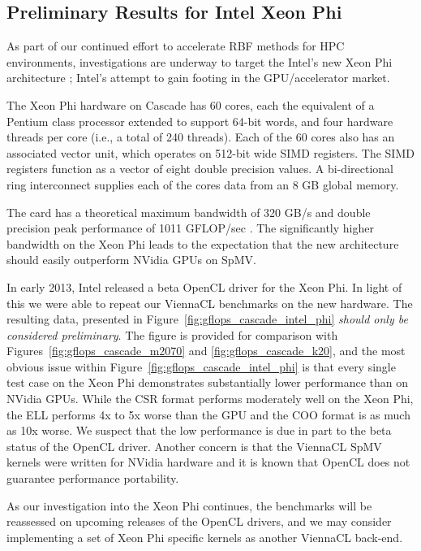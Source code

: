 \documentclass{report}
\begin{document}
\subsection{Preliminary Results for Intel Xeon Phi} 

As part of our continued effort to accelerate RBF methods for HPC environments, investigations are underway to target the Intel's new Xeon Phi architecture \cite{IntelXeonPhi2013}; Intel's attempt to gain footing in the GPU/accelerator market. 

The Xeon Phi hardware on Cascade has 60 cores, each the equivalent of a Pentium class processor extended to support 64-bit words, and four hardware threads per core (i.e., a total of 240 threads). Each of the 60 cores also has an associated vector unit, which operates on 512-bit wide SIMD registers. The SIMD registers function as a vector of eight double precision values. A bi-directional ring interconnect supplies each of the cores data from an 8 GB global memory. 

The card has a theoretical maximum bandwidth of 320 GB/s and double precision peak performance of 1011 GFLOP/sec \cite{IntelXeonPhi2013}. The significantly higher bandwidth on the Xeon Phi leads to the expectation that the new architecture should easily outperform NVidia GPUs on SpMV. 

In early 2013, Intel released a beta OpenCL driver for the Xeon Phi. In light of this we were able to repeat our ViennaCL benchmarks on the new hardware. The resulting data, presented in Figure~\ref{fig:gflops_cascade_intel_phi} \emph{should only be considered preliminary}.  The figure is provided for comparison with Figures~\ref{fig:gflops_cascade_m2070} and \ref{fig:gflops_cascade_k20}, and the most obvious issue within Figure~\ref{fig:gflops_cascade_intel_phi} is that every single test case on the Xeon Phi demonstrates substantially lower performance than on NVidia GPUs. While the CSR format performs moderately well on the Xeon Phi, the ELL performs 4x to 5x worse than the GPU and the COO format is as much as 10x worse. We suspect that the low performance is due in part to the beta status of the OpenCL driver. Another concern is that the ViennaCL SpMV kernels were written for NVidia hardware and it is known that OpenCL does not guarantee performance portability. 

As our investigation into the Xeon Phi continues, the benchmarks will be reassessed on upcoming releases of the OpenCL drivers, and we may consider implementing a set of Xeon Phi specific kernels as another ViennaCL back-end. 
\end{document}
